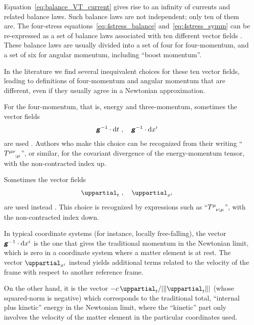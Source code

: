 \documentclass[\ifafour a4paper,12pt,\else a5paper,10pt,\fi%
onecolumn,oneside,article,%
british%
]{memoir}
\theoremstyle{remark}
\theoremstyle{innote}
\newcommand*{\mathte}[1]{\textbf{\textit{\textsf{#1}}}}
\newcommand*{\de}{\mathop{}\!\uppartial}%
\newcommand*{\di}{\mathop{}\!\mathrm{d}}%
\DeclarePairedDelimiter\abs{\lvert}{\rvert}
\renewcommand*{\|}[1][]{\nonscript\:#1\vert\nonscript\:\mathopen{}}
\newcommand*{\sect}{\S}%
\newcommand*{\chap}{ch.}%
\newcommand*{\eqn}{eq.}%
\renewcommand*{\i}{{}\indices}
\newcommand*{\se}[1]{\de_{#1}}
\newcommand*{\si}[1]{\di{#1}}
\newcommand*{\yg}{\mathte{g}}
\DeclarePairedDelimiter\nor{\lVert}{\rVert}
\begin{document}
\medskip

Equation~\eqref{eq:balance_VT_current} gives rise to an infinity of currents and related balance laws. Such balance laws are not independent; only ten of them are. The four-stress equations~\eqref{eq:4stress_balance} and~\eqref{eq:4stress_symm} can be re-expressed as a set of balance laws associated with ten different vector fields \autocites[\sect~3.2]{hawkingetal1973_r1994}[see also][]{gotayetal1992}. These balance laws are usually divided into a set of four for four-momentum, and a set of six for angular momentum, including \enquote{boost momentum}.

In the literature we find several inequivalent choices for these ten vector fields, leading to definitions of four-momentum and angular momentum that are different, even if they usually agree in a Newtonian approximation.

For the four-momentum, that is, energy and three-momentum, sometimes the vector fields
\begin{equation}
  \label{eq:four-momentum_up}
  \yg^{-1}\cdot\si{t} \ ,\quad \yg^{-1}\cdot\si{x^{i}}
\end{equation}
are used \autocites[for instance in][\sect~5.3, \chap~20]{misneretal1970_r2017}[\sect~6.1.3]{poissonetal2014}. Authors who make this choice can be recognized from their writing \enquote{$T\i{^{\mu\nu}_{;\mu}}$}, or similar, for the covariant divergence of the energy-momentum tensor, with the non-contracted index up.

Sometimes the vector fields
\begin{equation}
  \label{eq:four-momentum_down}
  \se{t} \ ,\quad \se{x^{i}}
\end{equation}
are used instead \autocites[for instance in][\sect~3.2 after \eqn~(3.2)]{hawkingetal1973_r1994}. This choice is recognized by expressions such as \enquote{$T\i{^{\mu}_{\nu;\mu}}$}, with the non-contracted index down.

In typical coordinate systems (for instance, locally free-falling), the vector $\yg^{-1}\cdot\si{x^{i}}$ is the one that gives the traditional momentum in the Newtonian limit, which is zero in a coordinate system where a matter element is at rest. The vector $\se{x^{i}}$ instead yields additional terms related to the velocity of the frame with respect to another reference frame.

On the other hand, it is the vector $-c\se{t}/\abs{\nor{\se{t}}}$ (whose squared-norm is negative) which corresponds to the traditional total, \enquote{internal plus kinetic} energy in the Newtonian limit, where the \enquote{kinetic} part only involves the velocity of the matter element in the particular coordinates used.
\end{document}
